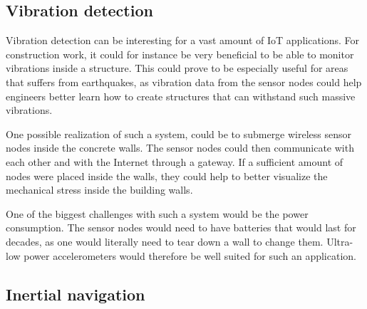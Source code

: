 


\subsection{Vibration detection}

Vibration detection can be interesting for a vast amount of IoT applications. For construction work, it could for instance be very beneficial to be able to monitor vibrations inside a structure. This could prove to be especially useful for areas that suffers from earthquakes, as vibration data from the sensor nodes could help engineers better learn how to create structures that can withstand such massive vibrations. 

One possible realization of such a system, could be to submerge wireless sensor nodes inside the concrete walls. The sensor nodes could then communicate with each other and with the Internet through a gateway. If a sufficient amount of nodes were placed inside the walls, they could help to better visualize the mechanical stress inside the building walls.

One of the biggest challenges with such a system would be the power consumption. The sensor nodes would need to have batteries that would last for decades, as one would literally need to tear down a wall to change them. Ultra-low power accelerometers would therefore be well suited for such an application. 

\subsection{Inertial navigation}


